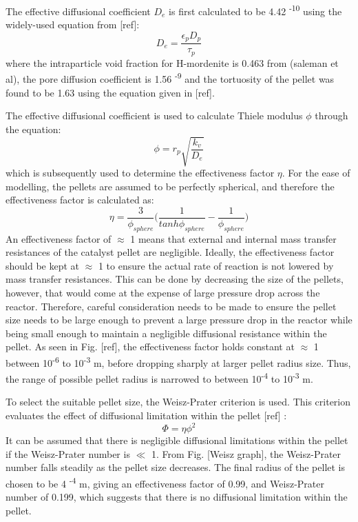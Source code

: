 The effective diffusional coefficient $D_e$ is first calculated to be 4.42 \textsuperscript{-10} using the widely-used equation from [ref]: 
\begin{equation}
    D_e = \frac{\epsilon_p D_p}{\tau_p}
\end{equation}
where the intraparticle void fraction for H-mordenite is 0.463 from (saleman et al), the pore diffusion coefficient is 1.56 \textsuperscript{-9} and the tortuosity of the pellet was found to be 1.63 using the equation given in [ref]. 

The effective diffusional coefficient is used to calculate Thiele modulus $\phi$ through the equation:
\begin{equation}
    \phi = r_p \sqrt{\frac{k_v}{D_e}}
\end{equation}
which is subsequently used to determine the effectiveness factor $\eta$. For the ease of modelling, the pellets are assumed to be perfectly spherical, and therefore the effectiveness factor is calculated as: 
\begin{equation}
    \eta = \frac{3}{\phi_{sphere}} \bigg(\frac{1}{tanh \phi_{sphere}} - \frac{1}{\phi_{sphere}}\bigg)
\end{equation}
An effectiveness factor of $\approx$ 1 means that external and internal mass transfer resistances of the catalyst pellet are negligible. Ideally, the effectiveness factor should be kept at $\approx$ 1 to ensure the actual rate of reaction is not lowered by mass transfer resistances. This can be done by decreasing the size of the pellets, however, that would come at the expense of large pressure drop across the reactor. Therefore, careful consideration needs to be made to ensure the pellet size needs to be large enough to prevent a large pressure drop in the reactor while being small enough to maintain a negligible diffusional resistance within the pellet. As seen in Fig. [ref], the effectiveness factor holds constant at $\approx$ 1 between 10\textsuperscript{-6} to 10\textsuperscript{-3} m, before dropping sharply at larger pellet radius size. Thus, the range of possible pellet radius is narrowed to between 10\textsuperscript{-4} to 10\textsuperscript{-3} m. 

To select the suitable pellet size, the Weisz-Prater criterion is used. This criterion evaluates the effect of diffusional limitation within the pellet [ref] :
\begin{equation}
    \Phi = \eta \phi^2
\end{equation}
It can be assumed that there is negligible diffusional limitations within the pellet if the Weisz-Prater number is $\ll$ 1. From Fig. [Weisz graph], the Weisz-Prater number falls steadily as the pellet size decreases. The final radius of the pellet is chosen to be 4 \textsuperscript{-4} m, giving an effectiveness factor of 0.99, and Weisz-Prater number of 0.199, which suggests that there is no diffusional limitation within the pellet.


